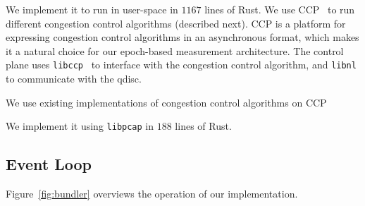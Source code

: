 
 We implement it to run in user-space in $1167$ lines of Rust.
We use CCP~\cite{ccp} to run different congestion control algorithms (described next). CCP is a platform for expressing congestion control algorithms in an asynchronous format, which makes it a natural choice for our epoch-based measurement architecture. The control plane uses \texttt{libccp}~\cite{ccp} to interface with the congestion control algorithm, and  \texttt{libnl} to communicate with the qdisc.

 We use existing implementations of congestion control algorithms on CCP~\cite{ccp}

\Para{\capoutbox} We implement it using \texttt{libpcap} in $188$ lines of Rust. 

\subsection{\name Event Loop}\label{s:impl:loop}
Figure~\ref{fig:bundler} overviews the operation of our \name implementation.

